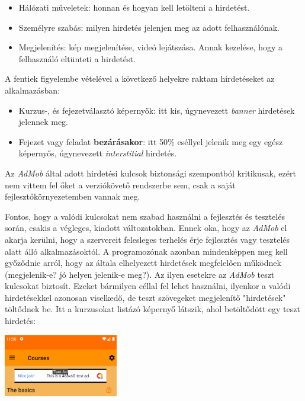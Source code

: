 \documentclass[12pt,a4paper]{article}
\begin{document}
	\begin{itemize}
		\item Hálózati műveletek: honnan és hogyan kell letölteni a hirdetést.
		\item Személyre szabás: milyen hirdetés jelenjen meg az adott felhasználónak.
		\item Megjelenítés: kép megjelenítése, videó lejátszása. Annak kezelése, hogy a felhasználó eltünteti a hirdetést.
	\end{itemize} 

	A fentiek figyelembe vételével a következő helyekre raktam hirdetéseket az alkalmazásban:
	
	\begin{itemize}
		\item Kurzus-, és fejezetválasztó képernyők: itt kis, úgynevezett \textit{banner} hirdetések jelennek meg.
		\item Fejezet vagy feladat \textbf{bezárásakor}: itt 50\% eséllyel jelenik meg egy egész képernyős, úgynevezett \textit{interstitial} hirdetés.
	\end{itemize}

	Az \textit{AdMob} által adott hirdetési kulcsok biztonsági szempontból kritikusak, ezért nem vittem fel őket a verziókövető rendszerbe sem, csak a saját fejlesztőkörnyezetemben vannak meg. 
	
	Fontos, hogy a valódi kulcsokat nem szabad használni a fejlesztés és tesztelés során, csakis a végleges, kiadott változatokban. Ennek oka, hogy az \textit{AdMob} el akarja kerülni, hogy a szervereit felesleges terhelés érje fejlesztés vagy tesztelés alatt álló alkalmazásoktól. A programozónak azonban mindenképpen meg kell győződnie arról, hogy az általa elhelyezett hirdetések megfelelően működnek (megjelenik-e? jó helyen jelenik-e meg?). Az ilyen esetekre az \textit{AdMob} teszt kulcsokat biztosít. Ezeket bármilyen céllal fel lehet használni, ilyenkor a valódi hirdetésekkel azonosan viselkedő, de teszt szövegeket megjelenítő "hirdetések" töltődnek be. Itt a kurzusokat listázó képernyő látszik, ahol betöltődött egy teszt hirdetés:  
	
	\begin{center}
		\includegraphics[width=5cm]{test_ad}
	\end{center}
\end{document}
